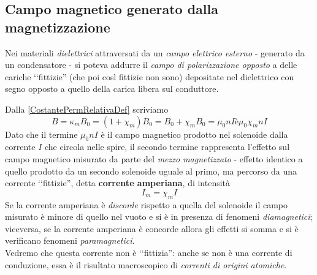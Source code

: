 \subsection{Campo magnetico generato dalla magnetizzazione}
\begin{remember}
	Nei materiali \textit{dielettrici} attraversati da un \textit{campo elettrico esterno} - generato da un condensatore - si poteva addurre il \textit{campo di polarizzazione opposto} a delle cariche ‘‘fittizie'' (che poi così fittizie non sono) depositate nel dielettrico con segno opposto a quello della carica libera sul conduttore.
\end{remember}
\noindent Dalla \eqref{CostantePermRelativaDef} scriviamo
\begin{equation*}
	B=\kappa_m B_0=\left(1+\chi_m\right)B_0=B_0+\chi_mB_0=\mu_0 n I è \mu_0 \chi_m n I
\end{equation*}
Dato che il termine $\mu_0 n I$ è il campo magnetico prodotto nel solenoide dalla corrente $I$ che circola nelle spire, il secondo termine rappresenta l'effetto sul campo magnetico misurato da parte del \textit{mezzo magnetizzato} - effetto identico a quello prodotto da un secondo solenoide uguale al primo, ma percorso da una corrente ‘‘fittizie'', detta \textbf{corrente amperiana}, di intensità
\begin{equation}
	I_m=\chi_m I
\end{equation}
Se la corrente amperiana è \textit{discorde} rispetto a quella del solenoide il campo misurato è minore di quello nel vuoto e si è in presenza di  fenomeni \textit{diamagnetici}; viceversa, se la corrente amperiana è concorde allora gli effetti si somma e si è verificano fenomeni \textit{paramagnetici}.\\
Vedremo che questa corrente non è ‘‘fittizia'': anche se non è una corrente di conduzione, essa è il risultato macroscopico di \textit{correnti di origini atomiche}.
